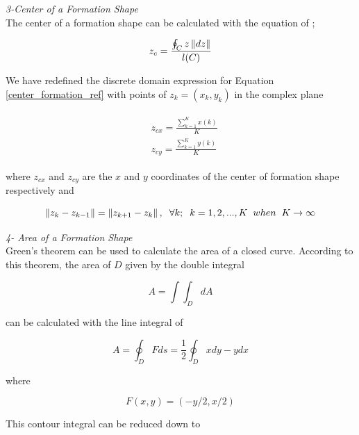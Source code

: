 \textit{ 	3-Center of a Formation Shape} \\ 	
The center of a formation shape can be calculated with the equation of \cite{17};

\begin{equation} \label{center_formation_ref}
 z_c = \frac{\oint_C z\left\lVert dz\right\rVert}{l(C)}
\end{equation}
		
We have redefined the discrete domain expression for Equation \ref{center_formation_ref} with points of  $z_k = (x_k,y_k)$ in the complex plane

\begin{align}
\begin{split}
&z_{cx} = \frac{\sum_{k=1}^{K}x(k)}{K}  \\
&z_{cy} = \frac{\sum_{k=1}^{K}y(k)}{K}  
\end{split}
\end{align}
		
where $z_{cx}$ and $z_{cy}$ are the $x$ and $y$ coordinates of the center of formation shape respectively and

\begin{equation}
\left\lVert z_k - z_{k-1}\right\rVert = \left\lVert z_{k+1} - z_k\right\rVert, \hspace{0.2cm}  \forall k ;  \hspace{0.2cm} k=1,2,...,K \hspace{0.2cm} when  \hspace{0.2cm} K \to\infty
\end{equation}

\textit{ 	4- Area of a Formation Shape} \\ 		
Green's theorem can be used to calculate the area of a closed curve. According to this theorem, the area of $D$ given by the double integral \cite{calculus}

\begin{equation}
 A = \int\int_D dA
\end{equation}
		
can be calculated with the line integral of

\begin{equation}
 A = \oint_D F ds = \frac{1}{2} \oint_D xdy - ydx
\end{equation}

where

\begin{equation}
F(x,y) = (-y/2,x/2)
\end{equation}
		
This contour integral can be reduced down to


